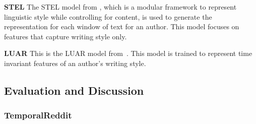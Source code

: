 \noindent \textbf{STEL} The STEL model from \citet{wegmann2021capture}, which is a modular framework to represent linguistic style while controlling for content, is used to generate the representation for each window of text for an author.
This model focuses on features that capture writing style only.

\noindent \textbf{LUAR} This is the LUAR model from~\cite{riverastao2021learning}. 
This model is trained to represent time invariant features of an author's writing style.

\subsection{Evaluation and Discussion}

\subsubsection{TemporalReddit}

